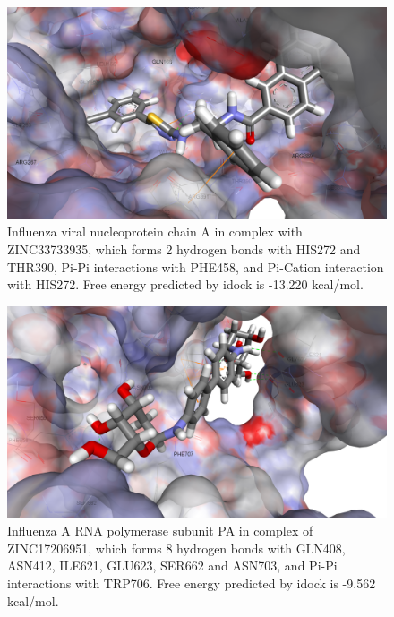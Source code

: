\begin{figure}
\centering
\includegraphics[width=\linewidth]{../influenza/2IQH-ZINC33733935.png}
\caption{Influenza viral nucleoprotein chain A in complex with ZINC33733935, which forms 2 hydrogen bonds with HIS272 and THR390, Pi-Pi interactions with PHE458, and Pi-Cation interaction with HIS272. Free energy predicted by idock is -13.220 kcal/mol.}
\label{Case:2IQH-ZINC33733935}
\end{figure}

\begin{figure}
\centering
\includegraphics[width=\linewidth]{../influenza/2ZNL-ZINC17206951.png}
\caption{Influenza A RNA polymerase subunit PA in complex of ZINC17206951, which forms 8 hydrogen bonds with GLN408, ASN412, ILE621, GLU623, SER662 and ASN703, and Pi-Pi interactions with TRP706. Free energy predicted by idock is -9.562 kcal/mol.}
\label{Case:2ZNL-ZINC17206951}
\end{figure}

